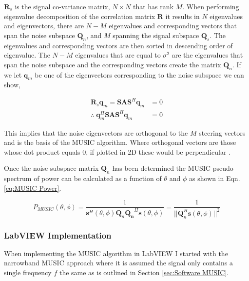 \documentclass{UoNMCHA}
\numberwithin{equation}{section}
\begin{document}
    $\mathbf{R}_s$ is the signal co-variance matrix, $N \times N$ that has rank $M$. When performing eigenvalue decomposition of the correlation matrix $\mathbf{R}$ it results in $N$ eigenvalues and eigenvectors, there are $N - M$ eigenvalues and corresponding vectors that span the noise subspace $\mathbf{Q}_n$, and $M$ spanning the signal subspace $\mathbf{Q}_s$.
    The eigenvalues and corresponding vectors are then sorted in descending order of eigenvalue. The $N-M$ eigenvalues that are equal to $\sigma^2$ are the eigenvalues that span the noise subspace and the corresponding vectors create the matrix $\mathbf{Q}_n$. If we let $\mathbf{q}_m$ be one of the eigenvectors corresponding to the noise subspace we can show,
    
    \begin{equation}
    \begin{split}
        \mathbf{R}_s\mathbf{q}_m = \mathbf{SAS}^H\mathbf{q}_m & = 0\\
        \therefore \; \mathbf{q}_m^H\mathbf{SAS}^H\mathbf{q}_m & = 0
    \end{split}
    \end{equation}

    This implies that the noise eigenvectors are orthogonal to the $M$ steering vectors and is the basis of the MUSIC algorithm. Where orthogonal vectors are those whose dot product equals $0$, if plotted in 2D these would be perpendicular \citep{Wei}.
    
    Once the noise subspace matrix $\mathbf{Q}_n$ has been determined the MUSIC pseudo spectrum of power can be calculated as a function of $\theta$ and $\phi$ as shown in Eqn. \ref{eq:MUSIC Power}.
    
    \begin{equation}
        P_{MUSIC}(\theta,\phi) = \frac{1}{\mathbf{s}^H(\theta,\phi)\mathbf{Q}_n\mathbf{Q_n}^H\mathbf{s}(\theta,\phi)} = \frac{1}{||\mathbf{Q}_n^H\mathbf{s}(\theta,\phi)||^2}
        \label{eq:MUSIC Power}
    \end{equation}

\subsubsection{LabVIEW Implementation} \label{sec:MUSIC LabVIEW}
    When implementing the MUSIC algorithm in LabVIEW I started with the narrowband MUSIC approach where it is assumed the signal only contains a single frequency $f$ the same as is outlined in Section \ref{sec:Software MUSIC}.
    
\end{document}
